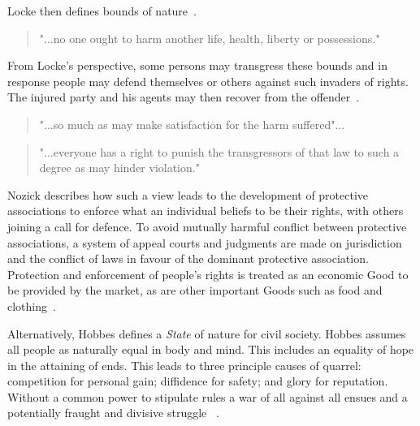 \documentclass[11pt, oneside]{book}   	%
\begin{document}
Locke then defines bounds of nature~\cite{jl1}.

\begin{quote}
"...no one ought to harm another life, health, liberty or possessions."
\end{quote}

From Locke's perspective, some persons may transgress these bounds and in response people may defend themselves or others against such invaders of rights.
The injured party and his agents may then recover from the offender~\cite{jl1}.

\begin{quote}
"...so much as may make satisfaction for the harm suffered"...
\end{quote}
\begin{quote}
"...everyone has a right to punish the transgressors of that law to such a degree as may hinder violation."
\end{quote}

Nozick describes how such a view leads to the development of protective associations to enforce what an individual beliefs to be their rights, with others joining a call for defence.
To avoid mutually harmful conflict between protective associations, a system of appeal courts and judgments are made on jurisdiction and the conflict of laws in favour of the dominant protective association.
Protection and enforcement of people's rights is treated as an economic Good to be provided by the market, as are other important Goods such as food and clothing~\cite{rn1}.\

Alternatively, Hobbes defines a \emph{State} of nature for civil society.
Hobbes assumes all people as naturally equal in body and mind.
This includes an equality of hope in the attaining of ends.
This leads to three principle causes of quarrel: competition for personal gain; diffidence for safety; and glory for reputation. Without a common power to stipulate rules a war of all against all ensues and a potentially fraught and divisive struggle ~\cite{th1}.
\end{document}
